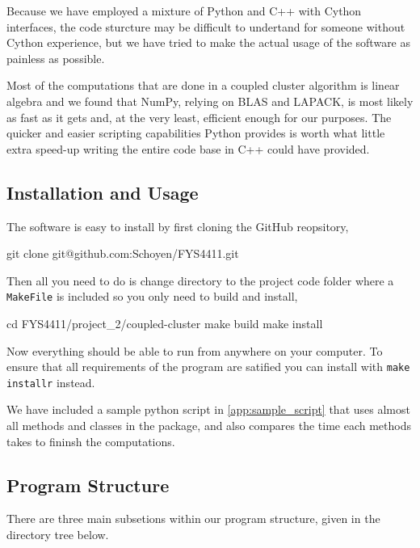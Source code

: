 \documentclass[
    a4paper, aps, twocolumn, floatfix, superscriptaddress,
    nofootinbib]{revtex4-1}
\newcommand{\1}{\mathds{1}}
\begin{document}
    Because we have employed a mixture of Python and C++ with Cython interfaces,
    the code sturcture may be difficult to undertand for someone without Cython
    experience, but we have tried to make the actual usage of the software as
    painless as possible.

    Most of the computations that are done in a coupled cluster algorithm
    is linear algebra and we found that NumPy, relying on
    BLAS and LAPACK, is most likely as fast as it gets and, at the very least,
    efficient enough for our purposes. The quicker and easier scripting capabilities
    Python provides is worth what little extra speed-up writing the entire
    code base in C++ could have provided.

    \subsection{Installation and Usage}

        The software is easy to install by first cloning the GitHub reopsitory,
        \begin{bash}
            git clone git@github.com:Schoyen/FYS4411.git
        \end{bash}
        Then all you need to do is change directory to the project code folder
        where a \lstinline{MakeFile} is included so you only need to build and
        install,
        \begin{bash}
            cd FYS4411/project_2/coupled-cluster
            make build
            make install
        \end{bash}
        Now everything should be able to run from anywhere on your computer.
        To ensure that all requirements of the program are satified you can
        install with \texttt{make installr} instead.

        We have included a sample python script in \autoref{app:sample_script}
        that uses almost all methods and classes in the package, and also compares
        the time each methods takes to fininsh the computations.

    \subsection{Program Structure}
        There are three main subsetions within our program structure,
        given in the directory tree below.

        \vspace{10pt}
        \vspace{10pt}
\end{document}
